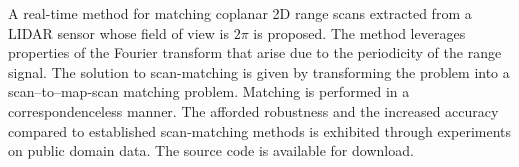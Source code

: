 A real-time method for matching coplanar 2D range scans extracted from a LIDAR
sensor whose field of view is $2\pi$ is proposed. The method leverages
properties of the Fourier transform that arise due to the periodicity of the
range signal.  The solution to scan-matching is given by transforming the
problem into a scan--to--map-scan matching problem. Matching is performed in a
correspondenceless manner. The afforded robustness and the increased accuracy
compared to established scan-matching methods is exhibited through experiments
on public domain data. The source code is available for download.
